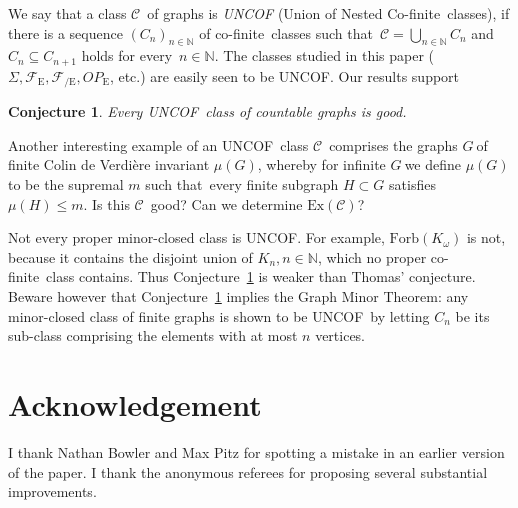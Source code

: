 \documentclass{article}
\newcommand{\forb}[1]{\mathrm{Forb}(#1)}
\newcommand{\ex}[1]{\mathrm{Ex}(#1)}
\newcommand{\frs}{\mathcal{F}}
\newcommand{\frsE}{\frs_\mathrm{E}}
\newcommand{\frsCE}{\frs_\mathrm{{/E}}}
\newcommand{\rme}[1]{\ensuremath{#1_{\mathrm{E}}}}
\newcommand{\ope}{\rme{OP}}
\newcommand{\cof}{co-finite}
\newcommand{\Cof}{Co-finite}
\newcommand{\uncof}{UNCOF}
\newcommand{\Sig}{\ensuremath{\Sigma}}
\newcommand{\comment}[1]{}
\newcommand{\defi}[1]{{\color{darkgray}\emph{#1}}}
\newcommand{\acknowledgement}{\section*{Acknowledgement}}
\newtheorem{lemma}[proposition]{Lemma}
\newtheorem{conjecture}{{Conjecture}}[section]
\newtheorem{problem}[conjecture]{{Problem}}
\newcommand{\N}{\ensuremath{\mathbb N}}
\newcommand{\cc}{\ensuremath{\mathcal C}}
\newcommand{\nin}{\ensuremath{{n\in\N}}}
\newcommand{\seq}[1]{\ensuremath{(#1_n)_{n\in\N}}}
\newcommand{\g}{\ensuremath{G\ }}
\newcommand{\Cnr}[1]{Con\-jecture~\ref{#1}}
\newcommand{\fe}{for every}
\newcommand{\st}{such that}
\begin{document}
We say that a class \cc\ of graphs is \defi{\uncof} (Union of Nested \Cof\ classes), if there is a sequence \seq{C} of \cof\ classes \st\ $\cc=\bigcup_{\nin} C_n$ and $C_n \subseteq C_{n+1}$ holds \fe\ $\nin$. The classes studied in this paper ($\Sig,\frsE,\frsCE, \ope$, etc.) are easily seen to be \uncof. Our results support


\begin{conjecture} \label{Con good}
Every \uncof\ class of countable graphs is good.
\end{conjecture}

Another interesting example of an \uncof\ class \cc\ comprises the graphs \g of finite Colin de Verdi\`ere invariant $\mu(G)$, whereby for infinite \g we define  $\mu(G)$ to be the supremal $m$ \st\ every finite subgraph $H\subset G$ satisfies $\mu(H)\leq m$. Is this \cc\ good? Can we determine $\ex{\cc}$? 

Not every proper minor-closed class is \uncof. For example, $\forb{K_\omega}$ is not, because it contains the disjoint union of $K_n, \nin$, which no proper \cof\ class contains. Thus \Cnr{Con good} is weaker than Thomas' conjecture. Beware however that \Cnr{Con good} implies the Graph Minor Theorem: any minor-closed class of finite graphs is shown to be \uncof\ by letting $C_n$ be its sub-class comprising the elements with at most $n$ vertices.

\acknowledgement{I thank Nathan Bowler and Max Pitz for spotting a mistake in an earlier version of the paper. I thank the anonymous referees for proposing several substantial improvements.}

\comment{
	\begin{lemma} \label{lem}


\end{lemma}
\begin{proof}\textcolor{red}{TOPROVE 24}\end{proof}

\begin{problem} \label{}

\end{problem} 
}









\end{document}
